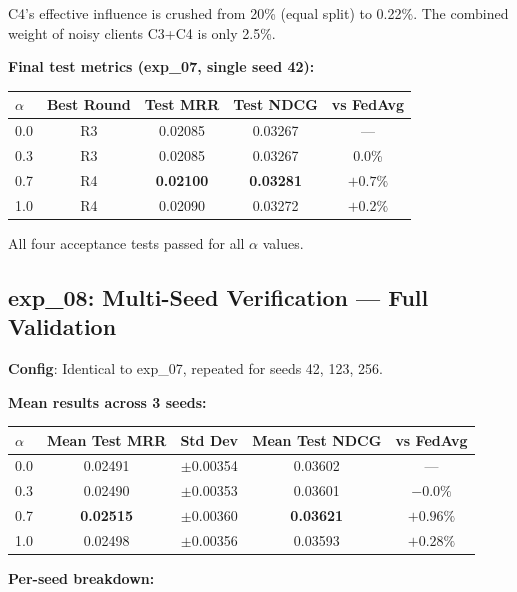 \documentclass[12pt,a4paper]{article}
\begin{document}
C4's effective influence is crushed from 20\% (equal split) to 0.22\%. The combined weight of noisy clients C3+C4 is only 2.5\%.

\textbf{Final test metrics (exp\_07, single seed 42):}

\begin{center}
\renewcommand{\arraystretch}{1.3}
\begin{tabular}{lcccc}
\toprule
$\alpha$ & \textbf{Best Round} & \textbf{Test MRR} & \textbf{Test NDCG} & \textbf{vs FedAvg} \\
\midrule
0.0 & R3 & 0.02085 & 0.03267 & --- \\
0.3 & R3 & 0.02085 & 0.03267 & 0.0\% \\
0.7 & R4 & \textbf{0.02100} & \textbf{0.03281} & $+0.7\%$ \\
1.0 & R4 & 0.02090 & 0.03272 & $+0.2\%$ \\
\bottomrule
\end{tabular}
\end{center}

All four acceptance tests passed for all $\alpha$ values.

\subsection{exp\_08: Multi-Seed Verification --- Full Validation}

\textbf{Config}: Identical to exp\_07, repeated for seeds 42, 123, 256.

\textbf{Mean results across 3 seeds:}

\begin{center}
\renewcommand{\arraystretch}{1.3}
\begin{tabular}{lcccc}
\toprule
$\alpha$ & \textbf{Mean Test MRR} & \textbf{Std Dev} & \textbf{Mean Test NDCG} & \textbf{vs FedAvg} \\
\midrule
0.0 & 0.02491 & $\pm$0.00354 & 0.03602 & --- \\
0.3 & 0.02490 & $\pm$0.00353 & 0.03601 & $-0.0\%$ \\
0.7 & \textbf{0.02515} & $\pm$0.00360 & \textbf{0.03621} & $\mathbf{+0.96\%}$ \\
1.0 & 0.02498 & $\pm$0.00356 & 0.03593 & $+0.28\%$ \\
\bottomrule
\end{tabular}
\end{center}

\textbf{Per-seed breakdown:}
\end{document}
